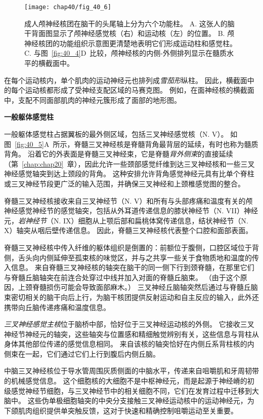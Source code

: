\begin{figure}[htbp]
	\centering
	\texttt{[image: chap40/fig\_40\_6]}
	\caption{成人颅神经核团在脑干的头尾轴上分为六个功能柱。
		A. 这张人的脑干背面图显示了颅神经感觉核（右）和运动核（左）的位置。
		B. 颅神经核团的功能组织示意图更清楚地表明它们形成运动柱和感觉柱。
		C. 与图~\ref{fig:40_4}D~比较，颅神经核的内侧-外侧排列显示在髓质水平的横截面中。}
	\label{fig:40_6}
\end{figure}


在每个运动核内，单个肌肉的运动神经元也排列成\textit{雪茄形}纵柱。
因此，横截面中的每个运动核都形成了受神经支配区域的马赛克图。
例如，在面神经核的横截面中，支配不同面部肌肉的神经元簇形成了面部的地形图。


\textbf{一般躯体感觉柱}

一般躯体感觉柱占据翼板的最外侧区域，包括三叉神经感觉核（N. V）。
如图~\ref{fig:40_5}A~所示，脊髓三叉神经核是脊髓背角最背层的延续，有时也称为髓质背角。
沿着它的外表面是脊髓三叉神经束，它是脊髓\textit{背外侧束}的直接延续（第~\ref{chap:chap20}~章），因此允许一些颈部感觉纤维到达三叉神经核和一些三叉神经感觉轴突到达上颈段的背角。
这种安排允许背角感觉神经元具有比单个脊柱或三叉神经节段更广泛的输入范围，并确保三叉神经和上颈椎感觉图的整合。


脊髓三叉神经核接收来自三叉神经节（N. V）和所有与头部疼痛和温度有关的颅神经感觉神经节的感觉轴突，包括从外耳道传递信息的膝状神经节（N. VII）神经元，\textit{岩神经节}（N. IX）细胞从上颚后部和扁桃体窝传递信息，结状神经节（N. X）轴突从咽后壁传递信息。
因此，脊髓三叉神经核代表整个口腔和面部表面。


脊髓三叉神经核中传入纤维的躯体组织是倒置的：前额位于腹侧，口腔区域位于背侧，舌头向内侧延伸至孤束核的味觉区，并与之共享一些关于食物质地和温度的传入信息。
来自脊髓三叉神经核的轴突在脑干的同一侧下行到颈脊髓，在那里它们与脊髓丘脑轴突在前连合处穿过中线并加入对面的脊髓丘脑束。
（由于这个原因，上颈脊髓损伤可能会导致面部麻木。）
三叉神经丘脑轴突然后通过与脊髓丘脑束密切相关的脑干向后上行，为脑干核团提供反射运动和自主反应的输入，此外还携带向丘脑传递疼痛和温度信息。


\textit{三叉神经感觉主核}位于脑桥中部，恰好位于三叉神经运动核的外侧。
它接收三叉神经节神经元的轴突，这些轴突与位置感和精细触觉辨别有关，这些信息与背柱从身体其他部位传递的感觉信息相同。
来自该核的轴突恰好在内侧丘系背柱核的内侧束在一起，它们通过它们上行到腹后内侧丘脑。


中脑三叉神经核位于导水管周围灰质侧面的中脑水平，传递来自咀嚼肌和牙周韧带的机械感觉信息。
这个细胞核的大细胞不是中枢神经元，而是起源于神经嵴的初级感觉神经节细胞，与三叉神经节中的相关细胞不同，它们在发育过程中迁移到大脑中。
这些伪单极细胞轴突的中央分支接触三叉神经运动核中的运动神经元，为下颌肌肉组织提供单突触反馈，这对于快速和精确控制咀嚼运动至关重要。


